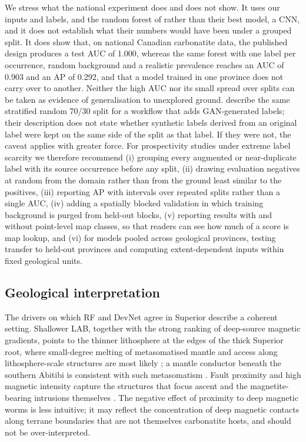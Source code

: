 \documentclass[pdflatex,sn-apa]{sn-jnl}
\begin{document}
We stress what the national experiment does and does not show. It uses our inputs and labels, and the random forest of \citet{Parsa2024} rather than their best model, a CNN, and it does not establish what their numbers would have been under a grouped split. It does show that, on national Canadian carbonatite data, the published design produces a test AUC of 1.000, whereas the same forest with one label per occurrence, random background and a realistic prevalence reaches an AUC of 0.903 and an AP of 0.292, and that a model trained in one province does not carry over to another. Neither the high AUC nor its small spread over splits can be taken as evidence of generalisation to unexplored ground. \citet{Parsa2025} describe the same stratified random 70/30 split for a workflow that adds GAN-generated labels; their description does not state whether synthetic labels derived from an original label were kept on the same side of the split as that label. If they were not, the caveat applies with greater force. For prospectivity studies under extreme label scarcity we therefore recommend (i) grouping every augmented or near-duplicate label with its source occurrence before any split, (ii) drawing evaluation negatives at random from the domain rather than from the ground least similar to the positives, (iii) reporting AP with intervals over repeated splits rather than a single AUC, (iv) adding a spatially blocked validation in which training background is purged from held-out blocks, (v) reporting results with and without point-level map classes, so that readers can see how much of a score is map lookup, and (vi) for models pooled across geological provinces, testing transfer to held-out provinces and computing extent-dependent inputs within fixed geological units.

\subsection{Geological interpretation}\label{sec:disc-geology}

The drivers on which RF and DevNet agree in Superior describe a coherent setting. Shallower LAB, together with the strong ranking of deep-source magnetic gradients, points to the thinner lithosphere at the edges of the thick Superior root, where small-degree melting of metasomatised mantle and access along lithosphere-scale structures are most likely \citep{Griffin2013,Groves2021,Hoggard2020}; a mantle conductor beneath the southern Abitibi is consistent with such metasomatism \citep{Snyder2021}. Fault proximity and high magnetic intensity capture the structures that focus ascent and the magnetite-bearing intrusions themselves \citep{Thomas2016}. The negative effect of proximity to deep magnetic worms is less intuitive; it may reflect the concentration of deep magnetic contacts along terrane boundaries that are not themselves carbonatite hosts, and should not be over-interpreted.
\end{document}
